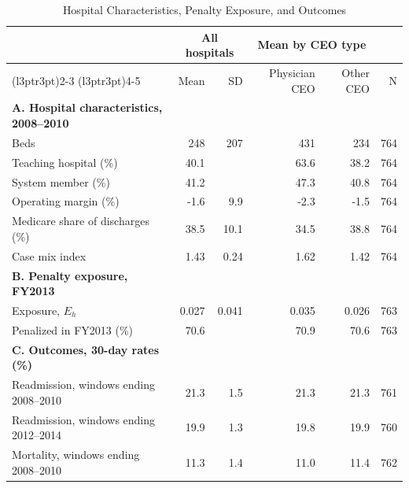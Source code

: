 \begin{table}

\caption{\label{tab:desc_hospitals}Hospital Characteristics, Penalty Exposure, and Outcomes}
\centering
\begin{threeparttable}
\begin{tabular}[t]{lrrrrr}
\toprule
\multicolumn{1}{c}{ } & \multicolumn{2}{c}{All hospitals} & \multicolumn{2}{c}{Mean by CEO type} & \multicolumn{1}{c}{ } \\
\cmidrule(l{3pt}r{3pt}){2-3} \cmidrule(l{3pt}r{3pt}){4-5}
 & Mean & SD & Physician CEO & Other CEO & N\\
\midrule
\textbf{A. Hospital characteristics, 2008--2010} &  &  &  &  & \\
\hspace{1em}Beds & 248 & 207 & 431 & 234 & 764\\
\hspace{1em}Teaching hospital (\%) & 40.1 &  & 63.6 & 38.2 & 764\\
\hspace{1em}System member (\%) & 41.2 &  & 47.3 & 40.8 & 764\\
\hspace{1em}Operating margin (\%) & -1.6 & 9.9 & -2.3 & -1.5 & 764\\
\hspace{1em}Medicare share of discharges (\%) & 38.5 & 10.1 & 34.5 & 38.8 & 764\\
\hspace{1em}Case mix index & 1.43 & 0.24 & 1.62 & 1.42 & 764\\
\addlinespace
\textbf{B. Penalty exposure, FY2013} &  &  &  &  & \\
\hspace{1em}Exposure, $E_h$ & 0.027 & 0.041 & 0.035 & 0.026 & 763\\
\hspace{1em}Penalized in FY2013 (\%) & 70.6 &  & 70.9 & 70.6 & 763\\
\addlinespace
\textbf{C. Outcomes, 30-day rates (\%)} &  &  &  &  & \\
\hspace{1em}Readmission, windows ending 2008--2010 & 21.3 & 1.5 & 21.3 & 21.3 & 761\\
\hspace{1em}Readmission, windows ending 2012--2014 & 19.9 & 1.3 & 19.8 & 19.9 & 760\\
\hspace{1em}Mortality, windows ending 2008--2010 & 11.3 & 1.4 & 11.0 & 11.4 & 762\\

\end{tabular}
\end{threeparttable}
\end{table}

